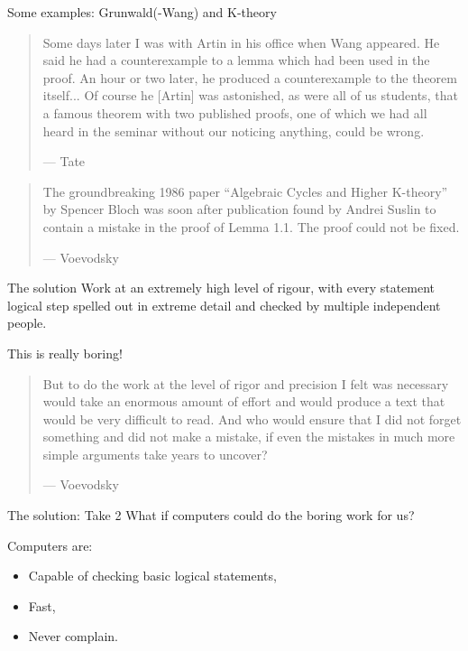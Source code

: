 \begin{frame}{Some examples: Grunwald(-Wang) and K-theory}

    \begin{quotation}
        Some days later I was with Artin in his office when Wang appeared. He said he had a counterexample to a lemma which had been used in the proof. An hour or two later, he produced a counterexample to the theorem itself... Of course he [Artin] was astonished, as were all of us students, that a famous theorem with two published proofs, one of which we had all heard in the seminar without our noticing anything, could be wrong.

        --- Tate
    \end{quotation}\pause


    \begin{quotation}
        The groundbreaking 1986 paper “Algebraic Cycles and Higher K-theory” by Spencer Bloch was soon after publication found by Andrei Suslin to contain a mistake in the proof of Lemma 1.1. The proof could not be fixed.

        --- Voevodsky
    \end{quotation}

\end{frame}

\begin{frame}{The solution}
    Work at an extremely high level of rigour, with every statement logical step spelled out in extreme detail and checked by multiple independent people.\pause

    \begin{problem}
        This is really boring!
    \end{problem}
    \pause

    \begin{quotation}
        But to do the work at the level of rigor and precision I felt was necessary would take an enormous amount of effort and would produce a text that would be very difficult to read. And who would ensure that I did not forget something and did not make a mistake, if even the mistakes in much more simple arguments take years to uncover?

        --- Voevodsky
    \end{quotation}


\end{frame}

\begin{frame}{The solution: Take 2}
    What if computers could do the boring work for us?\pause

    Computers are:
    \begin{itemize}
        \item Capable of checking basic logical statements,\pause
        \item Fast,\pause
        \item Never complain.
    \end{itemize}
\end{frame}

